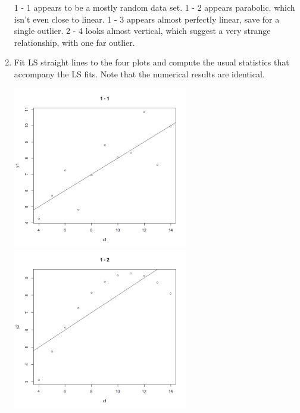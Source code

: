 \documentclass{article}
\begin{document}
\begin{enumerate}[\quad(a)]
\begin{center}
	\end{center}
	1 - 1 appears to be a mostly random data set. 1 - 2 appears parabolic, which isn't even close to linear.
	1 - 3 appears almost perfectly linear, save for a single outlier. 2 - 4 looks almost vertical, which suggest a very strange relationship, with one far outlier.

	\newpage
	\item Fit LS straight lines to the four plots and compute the usual statistics that accompany the LS fits. Note that the numerical results are identical.
	\begin{center}
		\includegraphics[width=3in]{Q65.png}\includegraphics[width=3in]{Q66.png}

\end{center}
\end{enumerate}
\end{document}
